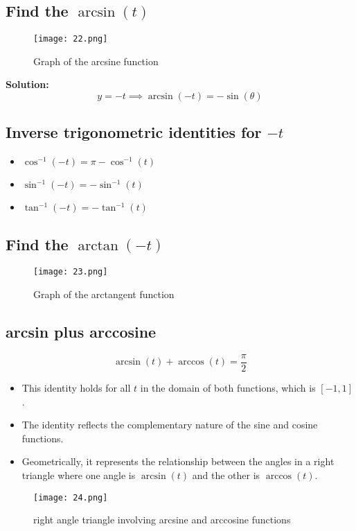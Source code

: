 \subsection{Find the $\arcsin(t)$}
\begin{figure}
    \centering
    \texttt{[image: 22.png]}
    \caption{Graph of the arcsine function}
\end{figure}
\textbf{Solution:}
\[ y = -t \implies \arcsin(-t) = -\sin(\theta) \]

\subsection{Inverse trigonometric identities for $-t$}
\begin{itemize}
    \item $ \cos^{-1}(-t) = \pi - \cos^{-1}(t) $
    \item $ \sin^{-1}(-t) = - \sin^{-1}(t) $
    \item $ \tan^{-1}(-t) = -\tan^{-1}(t) $
\end{itemize}

\subsection{Find the $\arctan(-t)$}
\begin{figure}
    \centering
    \texttt{[image: 23.png]}
    \caption{Graph of the arctangent function}
\end{figure}

\subsection{arcsin plus arccosine}
\[ \arcsin(t) + \arccos(t) = \frac{\pi}{2} \]
\begin{itemize}
    \item This identity holds for all $t$ in the domain of both functions, which is $[-1, 1]$.
    \item The identity reflects the complementary nature of the sine and cosine functions.
    \item Geometrically, it represents the relationship between the angles in a right triangle where one angle is $\arcsin(t)$ and the other is $\arccos(t)$.
\end{itemize}
\begin{figure}
    \centering
    \texttt{[image: 24.png]}
    \caption{right angle triangle involving arcsine and arccosine functions}
\end{figure}


